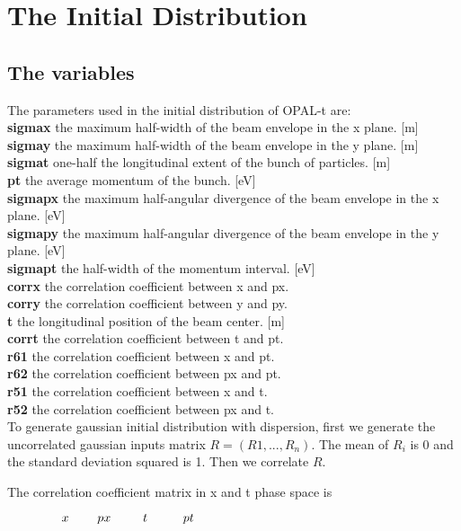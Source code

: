 \documentclass{article}
\begin{document}
\section{The Initial Distribution}
\subsection{The variables}
The parameters used in the initial distribution of OPAL-t are:\\
\textbf{sigmax} the maximum half-width of the beam envelope in the x
plane. [m] \\
\textbf{sigmay} the
maximum half-width of the beam envelope in the y plane. [m]\\
\textbf{sigmat} one-half the longitudinal extent of the bunch of particles. [m]\\
\textbf{pt} the average momentum of the bunch. [eV]\\
\textbf{sigmapx} the maximum half-angular divergence of
the beam envelope in the x plane. [eV]\\
\textbf{sigmapy} the maximum half-angular divergence of the beam
envelope in the y plane. [eV] \\
\textbf{sigmapt} the half-width of the momentum interval. [eV] \\
\textbf{corrx} the
correlation coefficient between x and px. \\
\textbf{corry} the correlation coefficient between y and py. \\
\textbf{t} the longitudinal position of the beam center. [m]\\
\textbf{corrt} the correlation coefficient between t and pt.\\
\textbf{r61} the correlation coefficient between x and pt. \\
\textbf{r62} the correlation coefficient between px and pt. \\
\textbf{r51} the correlation coefficient between x and t. \\
\textbf{r52} the correlation coefficient between px and t. \\

To generate gaussian initial distribution with dispersion, first we
generate the uncorrelated gaussian inputs matrix $R=(R1,...,R_n)$.
The mean of $R_i$ is 0 and the standard deviation squared is 1. Then
we correlate $R$.

The correlation coefficient matrix in x and t phase space is


$ \hspace{1.5cm}x \hspace{0.8cm}  px  \hspace{0.9cm} t\hspace{1.0cm}
pt
\\$
\end{document}
